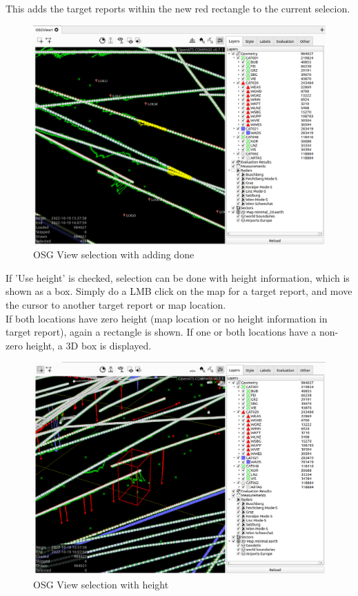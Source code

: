 This adds the target reports within the new red rectangle to the current selecion.

\begin{figure}[H]
    \hspace*{-2.5cm}
    \includegraphics[width=19cm,frame]{figures/osgview_select_add2.png}
  \caption{OSG View selection with adding done}
\end{figure}

If 'Use height' is checked, selection can be done with height information, which is shown as a box. Simply do a LMB click on the map for a target report, and move the cursor to another target report or map location.  \\

If both locations have zero height (map location or no height information in target report), again a rectangle is shown. If one or both locations have a non-zero height, a 3D box is displayed.

\begin{figure}[H]
    \hspace*{-2.5cm}
    \includegraphics[width=19cm,frame]{figures/osgview_select3d.png}
  \caption{OSG View selection with height}
\end{figure}


